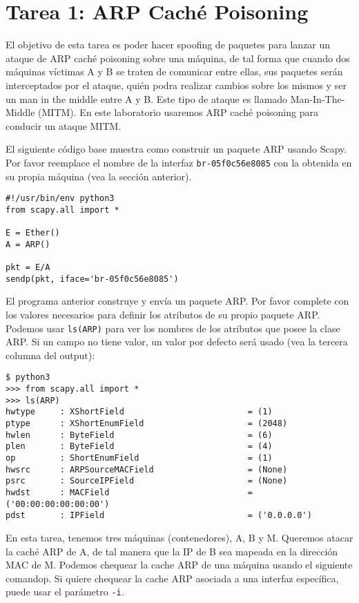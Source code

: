 \section{Tarea 1: ARP Caché Poisoning}

El objetivo de esta tarea es poder hacer spoofing de paquetes para lanzar un ataque de ARP caché poisoning sobre una máquina, de tal forma que cuando dos máquinas víctimas A y B se traten de comunicar entre ellas, sus paquetes serán interceptados por el ataque, quién podra realizar cambios sobre los mismos y ser un man in the middle entre A y B. Este tipo de ataque es llamado Man-In-The-Middle (MITM).
En este laboratorio usaremos ARP caché poisoning para conducir un ataque MITM.

El siguiente código base muestra como construir un paquete ARP usando Scapy.
Por favor reemplace el nombre de la interfaz \texttt{br-05f0c56e8085} con la obtenida en su propia máquina (vea la sección anterior).

\begin{lstlisting}
#!/usr/bin/env python3
from scapy.all import *

E = Ether()
A = ARP()

pkt = E/A
sendp(pkt, iface='br-05f0c56e8085')
\end{lstlisting}

El programa anterior construye y envía un paquete ARP. Por favor complete con los valores necesarios para definir los atributos de su propio paquete ARP. Podemos usar \texttt{ls(ARP)} para ver los nombres de los atributos que posee la clase ARP. Si un campo no tiene valor, un valor por defecto será usado (vea la tercera columna del output):


\begin{lstlisting}
$ python3
>>> from scapy.all import *
>>> ls(ARP)
hwtype     : XShortField                         = (1)
ptype      : XShortEnumField                     = (2048)
hwlen      : ByteField                           = (6)
plen       : ByteField                           = (4)
op         : ShortEnumField                      = (1)
hwsrc      : ARPSourceMACField                   = (None)
psrc       : SourceIPField                       = (None)
hwdst      : MACField                            = ('00:00:00:00:00:00')
pdst       : IPField                             = ('0.0.0.0')
\end{lstlisting}

En esta tarea, tenemos tres máquinas (contenedores), A, B y M.
Queremos atacar la caché ARP de A, de tal manera que la IP de B sea mapeada en la dirección MAC de M. Podemos chequear la cache ARP de una máquina usando el siguiente comandop. Si quiere chequear la cache ARP asociada a una interfaz específica, puede usar el parámetro \texttt{-i}.

